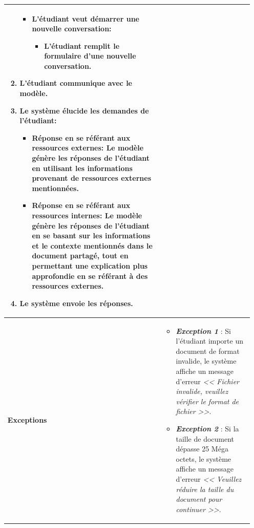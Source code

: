 \begin{itemize}[itemsep=1pt, parsep=1pt]
\begin{longtable}{|>{\RaggedRight\arraybackslash}p{4cm}|>{\RaggedRight\arraybackslash}p{12cm}|}
\begin{enumerate}
\begin{itemize}[label=--]
\begin{itemize}[label=5.1.]
                \end{itemize}
                \item L’étudiant veut démarrer une nouvelle conversation: 
                \begin{itemize}[label=5.1.]
                    \item L’étudiant remplit le formulaire d’une nouvelle conversation.
                \end{itemize}
            \end{itemize}
            \item L’étudiant communique avec le modèle.
            \item Le système élucide les demandes de l’étudiant:
            \begin{itemize}[label=--]
                \item Réponse en se référant aux ressources externes: Le modèle génère les réponses de l'étudiant en utilisant les informations provenant de ressources externes mentionnées.
                \item Réponse en se référant aux ressources internes: Le modèle génère les réponses de l'étudiant en se basant sur les informations et le contexte mentionnés dans le document partagé, tout en permettant une explication plus approfondie en se référant à des ressources externes.
            \end{itemize}
            \item Le système envoie les réponses.
        \end{enumerate}\\
        \hline
        \textbf{Exceptions} & 
        \begin{itemize}[label=--]
            \item \textbf{\textit{Exception 1}} : Si l’étudiant importe un document de format invalide, le système affiche un message d’erreur \textit{<< Fichier invalide, veuillez vérifier le format de fichier >>}.
            \item \textbf{\textit{Exception 2}} : Si la taille de document dépasse 25 Méga octets, le système affiche un message d’erreur \textit{<< Veuillez réduire la taille du document pour continuer >>}.
        \end{itemize} \\
        \hline
    \end{longtable}
    

\end{itemize}
